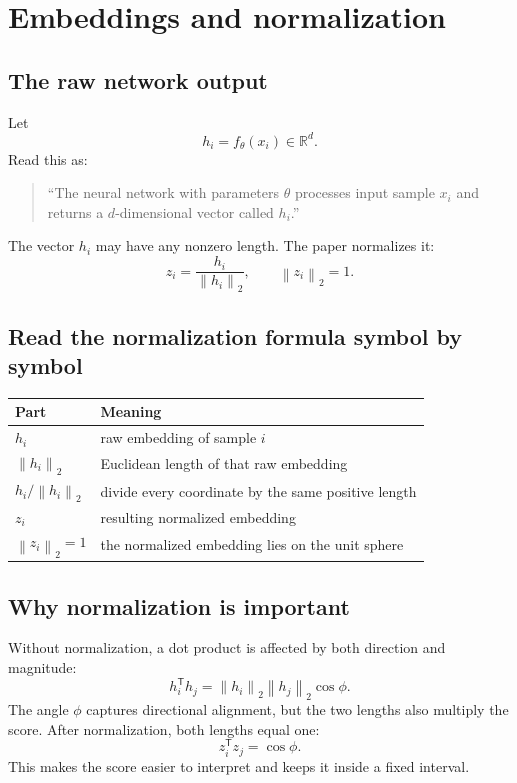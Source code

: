 \documentclass[11pt,oneside,openany]{book}
\theoremstyle{myplain}
\theoremstyle{definition}
\newcommand{\R}{\mathbb{R}}
\newcommand{\norm}[1]{\left\lVert #1\right\rVert}
\begin{document}
\section{Embeddings and normalization}

\subsection{The raw network output}

Let
\[
  h_i=f_\theta(x_i)\in\R^d.
\]
Read this as:

\begin{quote}
``The neural network with parameters $\theta$ processes input sample $x_i$ and returns a $d$-dimensional vector called $h_i$.''
\end{quote}

The vector $h_i$ may have any nonzero length. The paper normalizes it:
\begin{equation}
  z_i=\frac{h_i}{\norm{h_i}_2},\qquad \norm{z_i}_2=1.
  \label{eq:normalize}
\end{equation}

\subsection{Read the normalization formula symbol by symbol}

\begin{center}
\begin{tabularx}{\textwidth}{>{\bfseries}l X}
\toprule
Part & Meaning \\
\midrule
$h_i$ & raw embedding of sample $i$ \\
$\norm{h_i}_2$ & Euclidean length of that raw embedding \\
$h_i/\norm{h_i}_2$ & divide every coordinate by the same positive length \\
$z_i$ & resulting normalized embedding \\
$\norm{z_i}_2=1$ & the normalized embedding lies on the unit sphere \\
\bottomrule
\end{tabularx}
\end{center}

\subsection{Why normalization is important}

Without normalization, a dot product is affected by both direction and magnitude:
\[
  h_i^{\mathsf T}h_j=\norm{h_i}_2\norm{h_j}_2\cos\phi.
\]
The angle $\phi$ captures directional alignment, but the two lengths also multiply the score. After normalization, both lengths equal one:
\[
  z_i^{\mathsf T}z_j=\cos\phi.
\]
This makes the score easier to interpret and keeps it inside a fixed interval.
\end{document}
